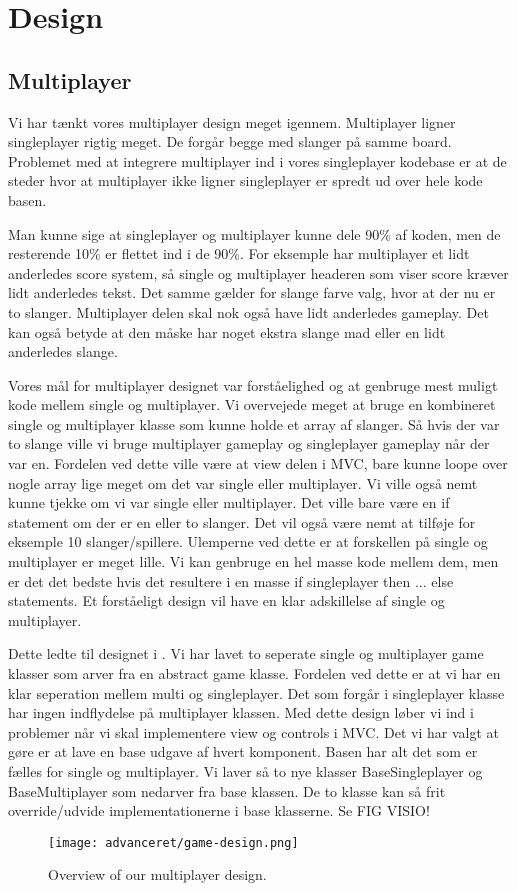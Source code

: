 
\section{Design}


\subsection{Multiplayer}
Vi har tænkt vores multiplayer design meget igennem. Multiplayer ligner singleplayer rigtig meget. De forgår begge med slanger på samme board.  Problemet med at integrere multiplayer ind i vores singleplayer kodebase er at de steder hvor at multiplayer ikke ligner singleplayer er spredt ud over hele kode basen. 

Man kunne sige at singleplayer og multiplayer kunne dele 90\% af koden, men de resterende 10\% er flettet ind i de 90\%. For eksemple har multiplayer et lidt anderledes score system, så single og multiplayer headeren som viser score kræver lidt anderledes tekst. Det samme gælder for slange farve valg, hvor at der nu er to slanger. Multiplayer delen skal nok også have lidt anderledes gameplay. Det kan også betyde at den måske har noget ekstra slange mad eller en lidt anderledes slange. 

Vores mål for multiplayer designet var forståelighed og at genbruge mest muligt kode mellem single og multiplayer. Vi overvejede meget at bruge en kombineret single og multiplayer klasse som kunne holde et array af slanger. Så hvis der var to slange ville vi bruge multiplayer gameplay og singleplayer gameplay når der var en. Fordelen ved dette ville være at view delen i MVC, bare kunne loope over nogle array lige meget om det var single eller multiplayer. Vi ville også nemt kunne tjekke om vi var single eller multiplayer. Det ville bare være en if statement om der er en eller to slanger. Det vil også være nemt at tilføje for eksemple 10 slanger/spillere. Ulemperne ved dette er at forskellen på single og multiplayer er meget lille. Vi kan genbruge en hel masse kode mellem dem, men er det det bedste hvis det resultere i en masse if singleplayer then ... else statements.  Et forståeligt design vil have en klar adskillelse af single og multiplayer.

Dette ledte til designet i  . Vi har lavet to seperate single og multiplayer game klasser som arver fra en abstract game klasse. Fordelen ved dette er at vi har en klar seperation mellem multi og singleplayer. Det som forgår i singleplayer klasse har ingen indflydelse på multiplayer klassen. Med dette design løber vi ind i problemer når vi skal implementere view og controls i MVC. Det vi har valgt at gøre er at lave en base udgave af hvert komponent. Basen har alt det som er fælles for single og multiplayer. Vi laver så to nye klasser BaseSingleplayer og BaseMultiplayer som nedarver fra base klassen.  De to klasse kan så frit override/udvide implementationerne i base klasserne.  Se FIG VISIO!


\begin{figure}
	\centering
	\graphicspath{ {pics/} }
   \texttt{[image: advanceret/game-design.png]}
	\hspace{0.1\textwidth}
	\caption{Overview of our multiplayer design.}
\end{figure}

